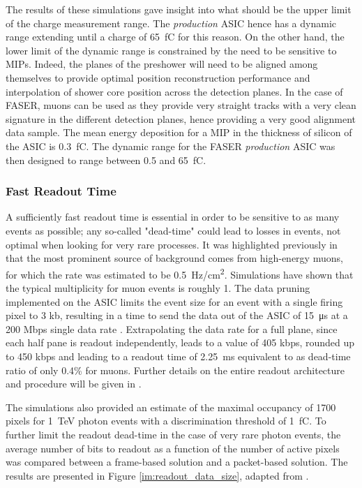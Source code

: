 		The results of these simulations gave insight into what should be the upper limit of the charge measurement range. The \textit{production} ASIC hence has a dynamic range extending until a charge of \SI{65}{\femto\coulomb} for this reason. On the other hand, the lower limit of the dynamic range is constrained by the need to be sensitive to MIPs. Indeed, the planes of the preshower will need to be aligned among themselves to provide optimal position reconstruction performance and interpolation of shower core position across the detection planes. In the case of FASER, muons can be used as they provide very straight tracks with a very clean signature in the different detection planes, hence providing a very good alignment data sample. The mean energy deposition for a MIP in the thickness of silicon of the ASIC is \SI{0.3}{\femto\coulomb}. The dynamic range for the FASER \textit{production} ASIC was then designed to range between 0.5 and \SI{65}{\femto\coulomb}.
		
		\subsubsection{Fast Readout Time}
		A sufficiently fast readout time is essential in order to be sensitive to as many events as possible; any so-called "dead-time" could lead to losses in events, not optimal when looking for very rare processes. It was highlighted previously in  that the most prominent source of background comes from high-energy muons, for which the rate was estimated to be \SI{0.5}{\hertz/\centi\meter\squared}. Simulations have shown that the typical multiplicity for muon events is roughly 1. The data pruning implemented on the ASIC limits the event size for an event with a single firing pixel to 3 kb, resulting in a time to send the data out of the ASIC of \SI{15}{\micro\second} at a 200 Mbps single data rate \cite{PreShower_TP}. Extrapolating the data rate for a full plane, since each half pane is readout independently, leads to a value of 405 kbps, rounded up to 450 kbps \cite{PreShower_TP} and leading to a readout time of \SI{2.25}{\milli\second} equivalent to as dead-time ratio of only 0.4\% for muons. Further details on the entire readout architecture and procedure will be given in .
		
			The simulations also provided an estimate of the maximal occupancy of 1700 pixels for \SI{1}{\tera\electronvolt} photon events with a discrimination threshold of \SI{1}{\femto\coulomb}. To further limit the readout dead-time in the case of very rare photon events, the average number of bits to readout as a function of the number of active pixels was compared between a frame-based solution and a packet-based solution. The results are presented in Figure \ref{im:readout_data_size}, adapted from \cite{Martinelli_thesis}.
			
